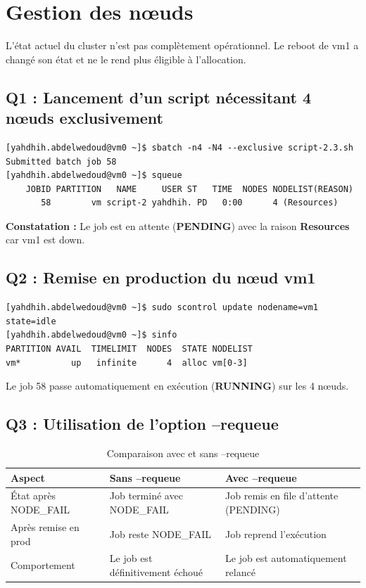 \documentclass[12pt,a4paper]{article}
\begin{document}
\section{Gestion des nœuds}

L'état actuel du cluster n'est pas complètement opérationnel. Le reboot de vm1 a changé son état et ne le rend plus éligible à l'allocation.

\subsection{Q1 : Lancement d'un script nécessitant 4 nœuds exclusivement}

\begin{lstlisting}
[yahdhih.abdelwedoud@vm0 ~]$ sbatch -n4 -N4 --exclusive script-2.3.sh
Submitted batch job 58
[yahdhih.abdelwedoud@vm0 ~]$ squeue
    JOBID PARTITION   NAME     USER ST   TIME  NODES NODELIST(REASON)
       58        vm script-2 yahdhih. PD   0:00      4 (Resources)
\end{lstlisting}

\textbf{Constatation :} Le job est en attente (\textbf{PENDING}) avec la raison \textbf{Resources} car vm1 est down.

\subsection{Q2 : Remise en production du nœud vm1}

\begin{lstlisting}
[yahdhih.abdelwedoud@vm0 ~]$ sudo scontrol update nodename=vm1 state=idle
[yahdhih.abdelwedoud@vm0 ~]$ sinfo
PARTITION AVAIL  TIMELIMIT  NODES  STATE NODELIST
vm*          up   infinite      4  alloc vm[0-3]
\end{lstlisting}

Le job 58 passe automatiquement en exécution (\textbf{RUNNING}) sur les 4 nœuds.

\subsection{Q3 : Utilisation de l'option --requeue}

\begin{table}[h]
\centering
\begin{tabular}{|l|p{5cm}|p{5cm}|}
\hline
\textbf{Aspect} & \textbf{Sans --requeue} & \textbf{Avec --requeue} \\
\hline
État après NODE\_FAIL & Job terminé avec NODE\_FAIL & Job remis en file d'attente (PENDING) \\
Après remise en prod & Job reste NODE\_FAIL & Job reprend l'exécution \\
Comportement & Le job est définitivement échoué & Le job est automatiquement relancé \\
\hline
\end{tabular}
\caption{Comparaison avec et sans --requeue}
\end{table}
\end{document}
